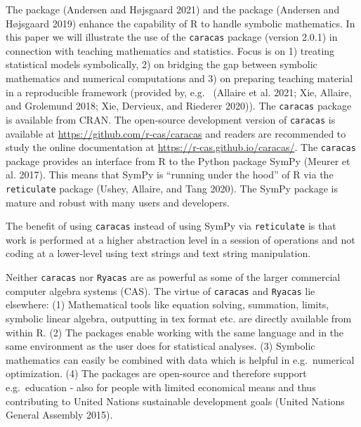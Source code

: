The  package (Andersen and Højsgaard 2021) and the 
package (Andersen and Højsgaard 2019) enhance the capability of R to handle
symbolic mathematics. In this paper we will illustrate the use of the
\texttt{caracas} package (version 2.0.1) in connection with teaching mathematics and
statistics. Focus is on 1) treating statistical models symbolically,
2) on bridging the gap between symbolic mathematics and numerical
computations and 3) on preparing teaching material in a reproducible
framework (provided by, e.g.~ (Allaire et al. 2021; Xie, Allaire, and Grolemund 2018; Xie, Dervieux, and Riederer 2020)). The \texttt{caracas} package
is available from CRAN. The open-source development version of
\texttt{caracas} is available at \url{https://github.com/r-cas/caracas} and
readers are recommended to study the online documentation at
\url{https://r-cas.github.io/caracas/}. The \texttt{caracas} package provides an
interface from R to the Python package SymPy (Meurer et al. 2017). This
means that SymPy is ``running under the hood'' of R via the
\texttt{reticulate} package (Ushey, Allaire, and Tang 2020). The SymPy package is mature and
robust with many users and developers.

The benefit of using \texttt{caracas} instead of using SymPy via \texttt{reticulate}
is that work is performed at a higher abstraction level in a session of
operations and not coding at a lower-level using text strings and
text string manipulation.

Neither \texttt{caracas} nor \texttt{Ryacas} are as powerful as some
of the larger commercial computer algebra systems (CAS). The virtue of
\texttt{caracas} and \texttt{Ryacas} lie elsewhere:
(1) Mathematical tools like equation solving, summation, limits, symbolic linear
algebra, outputting in tex format etc. are directly available from
within R.
(2) The packages enable working with the same language and in the same
environment as the user does for statistical analyses.
(3) Symbolic mathematics can easily be combined with data which is
helpful in e.g.~numerical optimization.
(4) The packages are open-source and therefore support e.g.~education - also for people
with limited economical means and thus contributing to United
Nations sustainable development goals (United Nations General Assembly 2015).

